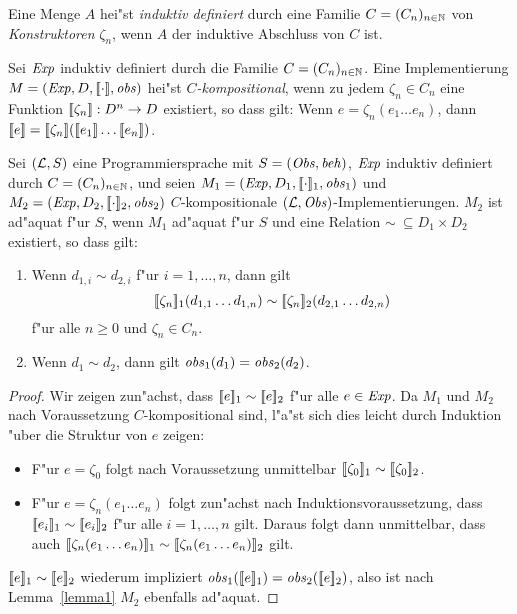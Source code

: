 \documentclass[12pt,a4paper]{article}
\begin{document}
\begin{definition}
  Eine Menge $A$ hei"st \emph{induktiv definiert} durch eine Familie $C = (C_n)_{n\in\mathbb N}$ von
  \emph{Konstruktoren} $\zeta_n$, wenn $A$ der induktive Abschluss von $C$ ist.
\end{definition}

\begin{definition}[Kompositionalit"at]
  Sei $\mathit{Exp}$ induktiv definiert durch die Familie $C=(C_n)_{n\in\mathbb N}$.
  Eine Implementierung $M=(\mathit{Exp},D,[\![\cdot]\!],\mathit{obs})$ hei"st \emph{$C$-kompositional},
  wenn zu jedem $\zeta_n \in C_n$ eine Funktion $[\![\zeta_n]\!]: D^n \to D$ existiert, so dass gilt:
  Wenn $e = \zeta_n (e_1 \ldots e_n)$, dann 
  $\semantic{e} = \semantic{\zeta_n}(\semantic{e_1} \ldots \semantic{e_n})$.
\end{definition}

\begin{theorem} \label{theorem1}
  Sei $(\mathcal L,S)$ eine Programmiersprache mit $S=(\mathit{Obs},\mathit{beh})$, $\mathit{Exp}$ induktiv definiert durch
  $C=(C_n)_{n\in\mathbb N}$, und seien $M_1=(\mathit{Exp},D_1,[\![\cdot]\!]_1,\mathit{obs}_1)$ und
  $M_2 = (\mathit{Exp},D_2,[\![\cdot]\!]_2,\mathit{obs}_2)$ $C$-kompositionale $(\mathcal L,\mathit{Obs})$-Implementierungen.
  $M_2$ ist ad"aquat f"ur $S$, wenn $M_1$ ad"aquat f"ur $S$ und eine Relation $\sim\ \subseteq D_1 \times D_2$
  existiert, so dass gilt:
  \begin{enumerate}
  \item Wenn $d_{1,i} \sim d_{2,i}$ f"ur $i=1,\ldots,n$, dann gilt
    \[[\![\zeta_n]\!]_1 (d_{1,1} \ldots d_{1,n}) \sim [\![\zeta_n]\!]_2 (d_{2,1} \ldots d_{2,n})\]
    f"ur alle $n \ge 0$ und $\zeta_n \in C_n$.
  \item Wenn $d_1 \sim d_2$, dann gilt $\mathit{obs}_1(d_1) = \mathit{obs}_2(d_2)$.
  \end{enumerate}
\end{theorem}

\begin{proof}
  Wir zeigen zun"achst, dass $[\![e]\!]_1 \sim [\![e]\!]_2$ f"ur alle $e\in\mathit{Exp}$. Da $M_1$ und $M_2$
  nach Voraussetzung $C$-kompositional sind, l"a"st sich dies leicht durch Induktion "uber die Struktur
  von $e$ zeigen:
  \begin{itemize}
  \item F"ur $e = \zeta_0$ folgt nach Voraussetzung unmittelbar $[\![\zeta_0]\!]_1 \sim [\![\zeta_0]\!]_2$.
  \item F"ur $e = \zeta_n(e_1 \ldots e_n)$ folgt zun"achst nach Induktionsvoraussetzung, dass
    $[\![e_i]\!]_1 \sim [\![e_i]\!]_2$ f"ur alle $i=1,\ldots,n$ gilt. Daraus folgt dann unmittelbar,
    dass auch $[\![\zeta_n(e_1 \ldots e_n)]\!]_1 \sim [\![\zeta_n(e_1 \ldots e_n)]\!]_2$ gilt.
  \end{itemize}
  $[\![e]\!]_1 \sim [\![e]\!]_2$ wiederum impliziert $\mathit{obs}_1([\![e]\!]_1)=\mathit{obs}_2([\![e]\!]_2)$,
  also ist nach Lemma~\ref{lemma1} $M_2$ ebenfalls ad"aquat.
\end{proof}
\end{document}
